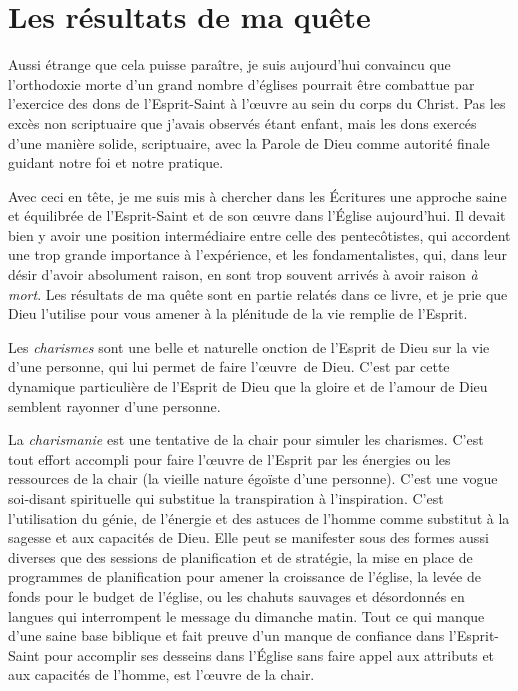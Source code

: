 \section{Les r\'esultats de ma qu\^ete}

Aussi étrange que cela puisse paraître, je suis aujour\-d'hui convaincu que
 l'orthodoxie morte d'un grand nombre d'églises pourrait être combattue par l'exercice des
 dons de l'Esprit-Saint à l'œuvre au sein du corps du Christ. Pas les excès non scriptuaire que
 j'avais observés étant enfant, mais les dons exercés d'une manière solide,
 scriptuaire, avec la Parole de Dieu comme autorité finale guidant notre foi et
 notre pratique.

Avec ceci en tête, je me suis mis à chercher dans les Écritures une
 approche saine et équilibrée de l'Esprit-Saint et de son œuvre dans l'Église
 aujourd'hui. Il devait bien y avoir une position inter\-mé\-di\-aire entre celle des
 pentecôtistes, qui accordent une trop grande importance à l'ex\-pé\-rience, et les
 fondamentalistes, qui, dans leur désir d'avoir absolument raison,
 en sont trop souvent arrivés à avoir raison \emph{à mort}.
 Les résultats de ma quête sont en partie relatés dans ce livre, et je prie que
 Dieu l'utilise pour vous amener à la plénitude de la vie remplie de
 l'Esprit.

Les \emph{charismes} sont une belle et naturelle onction de l'Esprit de Dieu
 sur la vie d'une personne, qui lui permet de faire l'œuvre~de Dieu. C'est par
 cette dynamique particulière de l'Esprit de Dieu que la gloire et de l'amour de Dieu
 semblent rayonner d'une personne.

La \emph{charismanie} est une tentative de la chair pour simuler les charismes.
 C'est tout effort accompli pour faire l'œuvre de l'Esprit par les énergies ou les
 ressources de la chair (la vieille nature égoïste d'une personne). C'est
 une vogue soi-disant spirituelle qui substitue la transpiration à l'inspiration. C'est
 l'utilisation du génie, de l'énergie et des astuces de l'homme comme substitut
 à la sagesse et aux capacités de Dieu. Elle peut se manifester sous des formes
 aussi diverses que des sessions de planification et de stratégie, la mise en place de
 programmes de planification pour amener la croissance de l'église, la levée de fonds
 pour le budget de l'église, ou les chahuts sauvages et désordonnés en langues
 qui interrompent le message du dimanche matin. Tout ce qui manque d'une saine base
 biblique et fait preuve d'un manque de confiance dans l'Esprit-Saint pour
 accomplir ses desseins dans l'Église sans faire appel aux attributs
 et aux capacités de l'homme, est l'œuvre de la chair.

